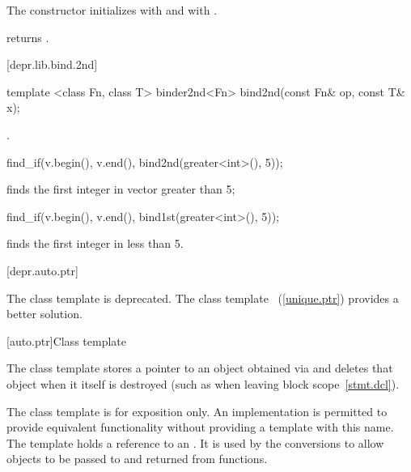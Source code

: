 \begin{itemdescr}
\pnum
The constructor initializes  with  and 
with .

\pnum
{} returns .
\end{itemdescr}

[depr.lib.bind.2nd]{}

%
\begin{itemdecl}
template <class Fn, class T>
  binder2nd<Fn> bind2nd(const Fn& op, const T& x);
\end{itemdecl}

\begin{itemdescr}
\pnum
\returns
{}.

\pnum
\enterexample
\begin{codeblock}
find_if(v.begin(), v.end(), bind2nd(greater<int>(), 5));
\end{codeblock}

finds the first integer in vector  greater than 5;

\begin{codeblock}
find_if(v.begin(), v.end(), bind1st(greater<int>(), 5));
\end{codeblock}

finds the first integer in  less than 5.
\exitexample
\end{itemdescr}

[depr.auto.ptr]{}

The class template  is deprecated.
\enternote The class template
~(\ref{unique.ptr}) provides a better
solution. \exitnote

[auto.ptr]{Class template }

\pnum
{}%
The class template  stores a pointer to an object obtained via 
and deletes that object when it itself is destroyed (such as when leaving block
scope~\ref{stmt.dcl}).

\pnum
The class template
is for exposition only.
An implementation is permitted to provide equivalent functionality without
providing a template with this name.
The template holds a reference to an . It
is used by the  conversions to allow  objects
to be passed to and returned from functions.

